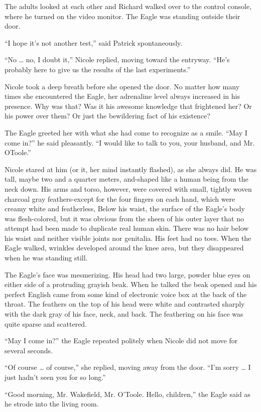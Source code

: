 \documentclass[]{article}
\begin{document}
{The adults looked at each other and Richard walked over to the control console, where he turned on the video monitor. The Eagle was standing outside their door.

“I hope it’s not another test,” said Patrick spontaneously.

“No … no, I doubt it,” Nicole replied, moving toward the entryway. “He’s probably here to give us the results of the last experiments.”

Nicole took a deep breath before she opened the door. No matter how many times she encountered the Eagle, her adrenaline level always increased in his presence. Why was that? Was it his awesome knowledge that frightened her? Or his power over them? Or just the bewildering fact of his existence?

The Eagle greeted her with what she had come to recognize as a smile. “May I come in?” he said pleasantly. “I would like to talk to you, your husband, and Mr. OToole.”

Nicole stared at him (or it, her mind instantly flashed), as she always did. He was tall, maybe two and a quarter meters, and-shaped like a human being from the neck down. His arms and torso, however, were covered with small, tightly woven charcoal gray feathers-except for the four fingers on each hand, which were creamy white and featherless, Below his waist, the surface of the Eagle’s body was flesh-colored, but it was obvious from the sheen of his outer layer that no attempt had been made to duplicate real human skin. There was no hair below his waist and neither visible joints nor genitalia. His feet had no toes. When the Eagle walked, wrinkles developed around the knee area, but they disappeared when he was standing still.

The Eagle’s face was mesmerizing. His head had two large, powder blue eyes on either side of a protruding grayish beak. When he talked the beak opened and his perfect English came from some kind of electronic voice box at the back of the throat. The feathers on the top of his head were white and contrasted sharply with the dark gray of his face, neck, and back. The feathering on his face was quite sparse and scattered.

“May I come in?” the Eagle repeated politely when Nicole did not move for several seconds.

“Of course … of course,” she replied, moving away from the door. “I’m sorry … I just hadn’t seen you for so long.”

“Good morning, Mr. Wakefield, Mr. O’Toole. Hello, children,” the Eagle said as he strode into the living room.

}
\end{document}
